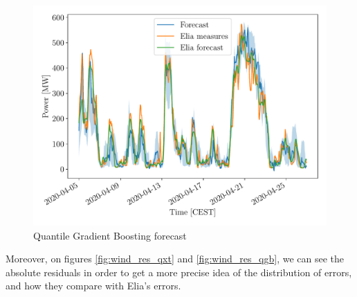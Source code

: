 \documentclass[a4paper, 12pt]{article}
\begin{document}
	\begin{figure}
		\centering
		\includegraphics[width=.8\textwidth]{resources/pdf/wind_eval_qgb.pdf}
		\vspace{-1em}
		\caption{Quantile Gradient Boosting forecast}
		\label{fig:wind_eval_qgb}
	\end{figure}

	Moreover, on figures \ref{fig:wind_res_qxt} and \ref{fig:wind_res_qgb}, we can see the absolute residuals in order to get a more precise idea of the distribution of errors, and how they compare with Elia's errors.
\end{document}
